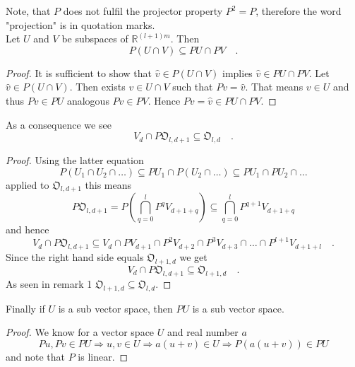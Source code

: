 \begin{remark}{}{}
	Note, that $P$ does not fulfil the projector property $P^2=P$, therefore the word 
	"projection" is in quotation marks.\\
	
	Let $U$ and $V$ be subspaces of $\mathbb{R}^{(l+1)m}$. Then
	\begin{equation}
	P(U\cap V) \subseteq PU \cap PV \quad .
	\end{equation}
	\begin{proof}
		It is sufficient to show that $\hat{v}\in P(U\cap V)$ implies $\hat{v}\in PU 
		\cap PV$. Let $\hat{v}\in P(U\cap V)$. Then exists $v\in U\cap V$ such that 
		$Pv=\hat{v}$. That means $v\in U$ and thus $Pv\in PU$ analogous $Pv\in PV$. 
		Hence $Pv = \hat{v}\in PU\cap PV$.
	\end{proof}
	As a consequence we see 
	\begin{equation}
	V_d \cap P\mathfrak{O}_{l,d+1} \subseteq \mathfrak{O}_{l,d}  \quad .
	\end{equation}	
	\begin{proof}
	Using the latter equation
	\begin{equation}
	P(U_1\cap U_2 \cap \ldots) \subseteq PU_1 \cap P(U_2\cap\ldots) \subseteq 
	PU_1\cap PU_2 \cap \ldots 
	\end{equation}
	applied to $\mathfrak{O}_{l,d+1}$ this means
	\begin{equation}
	P \mathfrak{O}_{l,d+1} = P \left( \bigcap\limits_{q=0}^l P^q V_{d+1+q}  \right)
	\subseteq \bigcap\limits_{q=0}^l P^{q+1} V_{d+1+q}
	\end{equation}
	and hence
	\begin{equation}
	V_{d}\cap P\mathfrak{O}_{l,d+1} \subseteq  
	V_{d} \cap P V_{d+1} \cap P^2 V_{d+2} \cap P^3 V_{d+3} \cap \ldots \cap P^{l+1}
	V_{d+1+l} \quad .
	\end{equation}
	Since the right hand side equals $\mathfrak{O}_{l+1,d}$ we get
	\begin{equation}	
	V_d \cap P\mathfrak{O}_{l,d+1} \subseteq 
	\mathfrak{O}_{l+1,d} \quad .
	\end{equation}
	As seen in remark 1 $\mathfrak{O}_{l+1,d} \subseteq \mathfrak{O}_{l,d}$.
	\end{proof}
	Finally if $U$ is a sub vector space, then $PU$ is a sub vector space.
	\begin{proof}
	We know for a vector space $U$ and real number $a$
	\begin{equation}
	Pu,Pv \in PU \Rightarrow u,v\in U \Rightarrow a(u+v)\in U \Rightarrow P(a(u+v))\in PU
	\end{equation}
	and note that $P$ is linear.
	\end{proof}
\end{remark}

